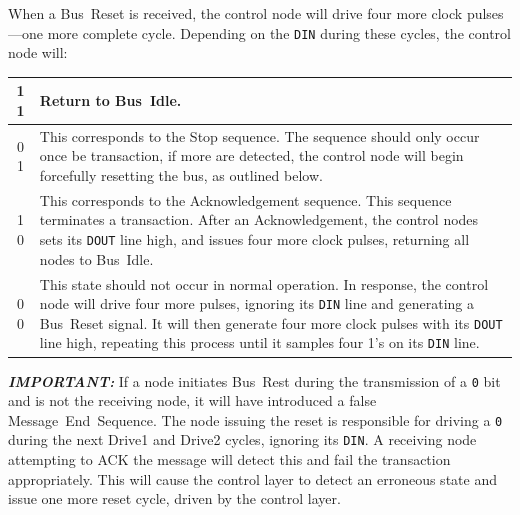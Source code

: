 When a Bus~Reset is received, the control node will drive four more clock
pulses---one more complete cycle.
Depending on the {\tt DIN} during these cycles, the control node will:
\begin{table}[h!]
  \def\arraystretch{2}
  \begin{tabularx}{\linewidth}{| c | X |}
    \hline
    1 1 & Return to Bus~Idle. \\ \hline
    0 1 & This corresponds to the Stop sequence. The sequence should only
    occur once be transaction, if more are detected, the control node will
    begin forcefully resetting the bus, as outlined below.\\ \hline
    1 0 & This corresponds to the Acknowledgement sequence. This sequence
    terminates a transaction. After an Acknowledgement, the control nodes sets
    its {\tt DOUT} line high, and issues four more clock pulses, returning all
    nodes to Bus~Idle. \\ \hline
    0 0 & This state should not occur in normal operation. In response, the
    control node will drive four more pulses, ignoring its {\tt DIN} line and
    generating a Bus~Reset signal. It will then generate four more clock
    pulses with its {\tt DOUT} line high, repeating this process until it
    samples four 1's on its {\tt DIN} line. \\ \hline
  \end{tabularx}
\end{table}

\noindent
\textbf{\em IMPORTANT:} If a node initiates Bus~Rest during the transmission
of a {\tt 0} bit and is not the receiving node, it will have introduced a
false Message~End~Sequence. The node issuing the reset is responsible for
driving a {\tt 0} during the next {\sc Drive1} and {\sc Drive2} cycles,
ignoring its {\tt DIN}.  A receiving node attempting to ACK the message will
detect this and fail the transaction appropriately. This will cause the
control layer to detect an erroneous state and issue one more reset cycle,
driven by the control layer.



